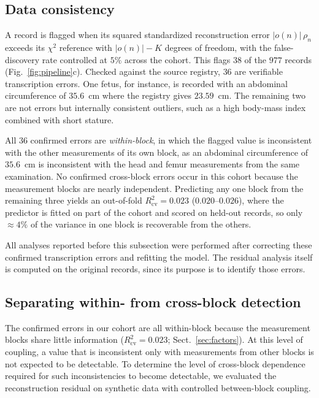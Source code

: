 \documentclass[a4paper,fleqn]{cas-sc}
\begin{document}
\subsection{Data consistency}\label{sec:consistency} A record is flagged when its squared standardized reconstruction error $|o(n)|\,\rho_n$ exceeds its $\chi^2$ reference with $|o(n)|-K$ degrees of freedom, with the false-discovery rate controlled at $5\%$ across the cohort. This flags $38$ of the $977$ records (Fig.~\ref{fig:pipeline}c). Checked against the source registry, $36$ are verifiable transcription errors. One fetus, for instance, is recorded with an abdominal circumference of $35.6$~cm where the registry gives $23.59$~cm. The remaining two are not errors but internally consistent outliers, such as a high body-mass index combined with short stature.

All $36$ confirmed errors are \emph{within-block}, in which the flagged value is inconsistent with the other measurements of its own block, as an abdominal circumference of $35.6$~cm is inconsistent with the head and femur measurements from the same examination. No confirmed cross-block errors occur in this cohort because the measurement blocks are nearly independent. Predicting any one block from the remaining three yields an out-of-fold $R^2_{\mathrm{cv}}=0.023$ ($0.020$--$0.026$), where the predictor is fitted on part of the cohort and scored on held-out records, so only $\approx4\%$ of the variance in one block is recoverable from the others.

All analyses reported before this subsection were performed after correcting these confirmed transcription errors and refitting the model. The residual analysis itself is computed on the original records, since its purpose is to identify those errors.

\subsection{Separating within- from cross-block detection}\label{sec:synth} The confirmed errors in our cohort are all within-block because the measurement blocks share little information ($R^2_{\mathrm{cv}}=0.023$; Sect.~\ref{sec:factors}). At this level of coupling, a value that is inconsistent only with measurements from other blocks is not expected to be detectable. To determine the level of cross-block dependence required for such inconsistencies to become detectable, we evaluated the reconstruction residual on synthetic data with controlled between-block coupling.
\end{document}
